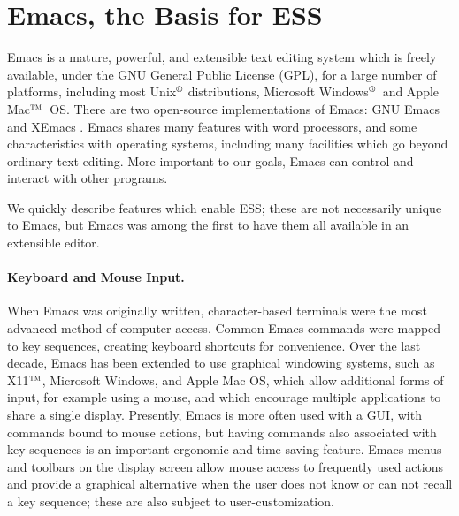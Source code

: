 \documentclass{article}
\newcommand*{\regstrd}{$^{\mbox{\scriptsize{\textregistered}}}$}
\newcommand*{\tm}{$^{\mbox{\scriptsize\sc tm}}$}
\begin{document}
\section{Emacs, the Basis for ESS}
\label{sec:emacs}

Emacs is a mature, powerful, and extensible text editing system which
is freely available, under the GNU General Public License (GPL), for a
large number of platforms, including most Unix\regstrd
distributions, Microsoft Windows\regstrd\ and Apple Mac\tm\ OS.  There
are two open-source implementations of Emacs: GNU Emacs
\citep{GNU-Emacs} and XEmacs \citep{XEmacs}.  Emacs shares many
features with word processors, and some characteristics with operating
systems, including many facilities which go beyond ordinary text
editing.  More important to our goals, Emacs can control and interact
with other programs.

We quickly describe features which enable ESS; these are not
necessarily unique to Emacs, but Emacs was among the first to have
them all available in an extensible editor.

\paragraph{Keyboard and Mouse Input.}
When Emacs was originally written, character-based terminals were the
most advanced method of computer access.  Common Emacs commands were
mapped to key sequences, creating keyboard shortcuts for convenience.
Over the last decade, Emacs has been extended to use graphical
windowing systems, such as X11\tm, Microsoft Windows, and Apple Mac
OS, which allow additional forms of input, for example using a mouse,
and which encourage multiple applications to share a single display.
Presently, Emacs is more often used with a GUI, with commands bound to
mouse actions, but having commands also associated with key sequences
is an important ergonomic and time-saving feature.  Emacs menus and
toolbars on the display screen allow mouse access to frequently used
actions and provide a graphical alternative when the user does not
know or can not recall a key sequence; these are also subject to
user-customization.
\end{document}
